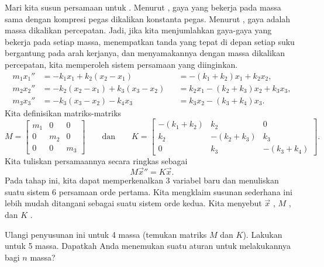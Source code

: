 Mari kita susun persamaan untuk .
Menurut , gaya yang bekerja pada massa sama dengan 
kompresi pegas dikalikan konstanta pegas.  Menurut
,
gaya adalah massa dikalikan percepatan.  Jadi, jika kita menjumlahkan gaya-gaya yang bekerja
pada setiap massa, menempatkan tanda yang tepat di depan setiap suku bergantung pada
arah kerjanya, dan menyamakannya dengan massa
dikalikan percepatan, kita memperoleh sistem
persamaan yang diinginkan.
\begin{equation*}
\begin{aligned}
m_1 x_1'' &= -k_1 x_1 + k_2 (x_2-x_1)
& & = -(k_1+k_2) x_1 + k_2 x_2 , \\
m_2 x_2'' &= -k_2 (x_2-x_1) + k_3 (x_3-x_2)
& & = k_2 x_1 -(k_2+k_3) x_2 + k_3 x_3 , \\
m_3 x_3'' &= -k_3 (x_3-x_2) - k_4 x_3
& & = k_3 x_2 - (k_3+k_4) x_3 . 
\end{aligned}
\end{equation*}
Kita definisikan matriks-matriks
\begin{equation*}
M =
\begin{bmatrix}
m_1 & 0 & 0 \\
0 & m_2 & 0 \\
0 & 0 & m_3
\end{bmatrix}
\qquad
\text{dan}
\qquad
K =
\begin{bmatrix}
-(k_1+k_2) & k_2 & 0 \\
k_2 & -(k_2+k_3) & k_3 \\
0 & k_3 & -(k_3+k_4)
\end{bmatrix} .
\end{equation*}
Kita tuliskan persamaannya secara ringkas sebagai
\begin{equation*}
M {\vec{x}}'' = K \vec{x} .
\end{equation*}
Pada tahap ini, kita dapat memperkenalkan 3 variabel baru dan menuliskan suatu sistem
6 persamaan orde pertama.  Kita mengklaim susunan sederhana ini lebih mudah ditangani sebagai
suatu sistem orde kedua.
Kita menyebut $\vec{x}$ \emph{}, $M$
\emph{}, dan $K$ \emph{}.

\begin{exercise}
Ulangi penyusunan ini untuk 4 massa (temukan matriks $M$ dan $K$).
Lakukan untuk 5 massa.  Dapatkah Anda
menemukan suatu aturan untuk melakukannya bagi $n$ massa?
\end{exercise}

